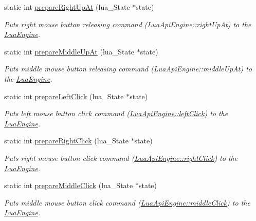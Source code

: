 \begin{DoxyCompactItemize}
static int \hyperlink{class_lua_api_engine_a63574f6087f18f635b1df170d51391a6}{prepare\-Right\-Up\-At} (lua\-\_\-\-State $\ast$state)
\begin{DoxyCompactList}\small\item\em Puts right mouse button releasing command (Lua\-Api\-Engine\-::right\-Up\-At) to the \hyperlink{class_lua_engine}{Lua\-Engine}. \end{DoxyCompactList}\item 
static int \hyperlink{class_lua_api_engine_aba8972c05819c262e4a9d8dec53b7e8f}{prepare\-Middle\-Up\-At} (lua\-\_\-\-State $\ast$state)
\begin{DoxyCompactList}\small\item\em Puts middle mouse button releasing command (Lua\-Api\-Engine\-::middle\-Up\-At) to the \hyperlink{class_lua_engine}{Lua\-Engine}. \end{DoxyCompactList}\item 
static int \hyperlink{class_lua_api_engine_aa4ec049683c5ca8fe5b317f9daa80cf2}{prepare\-Left\-Click} (lua\-\_\-\-State $\ast$state)
\begin{DoxyCompactList}\small\item\em Puts left mouse button click command (\hyperlink{class_lua_api_engine_ae857b39d951f50a206989c3422cb5494}{Lua\-Api\-Engine\-::left\-Click}) to the \hyperlink{class_lua_engine}{Lua\-Engine}. \end{DoxyCompactList}\item 
static int \hyperlink{class_lua_api_engine_a516e303be81f5691e5963e6a470a0d6c}{prepare\-Right\-Click} (lua\-\_\-\-State $\ast$state)
\begin{DoxyCompactList}\small\item\em Puts right mouse button click command (\hyperlink{class_lua_api_engine_a7b3664b6f2593d3bd817edeee61a18e6}{Lua\-Api\-Engine\-::right\-Click}) to the \hyperlink{class_lua_engine}{Lua\-Engine}. \end{DoxyCompactList}\item 
static int \hyperlink{class_lua_api_engine_a4644c161b4336ff836816a8ecbed562e}{prepare\-Middle\-Click} (lua\-\_\-\-State $\ast$state)
\begin{DoxyCompactList}\small\item\em Puts middle mouse button click command (\hyperlink{class_lua_api_engine_a633c229323434db2d1af7f66c1517a34}{Lua\-Api\-Engine\-::middle\-Click}) to the \hyperlink{class_lua_engine}{Lua\-Engine}. \end{DoxyCompactList}\item 

\end{DoxyCompactItemize}
